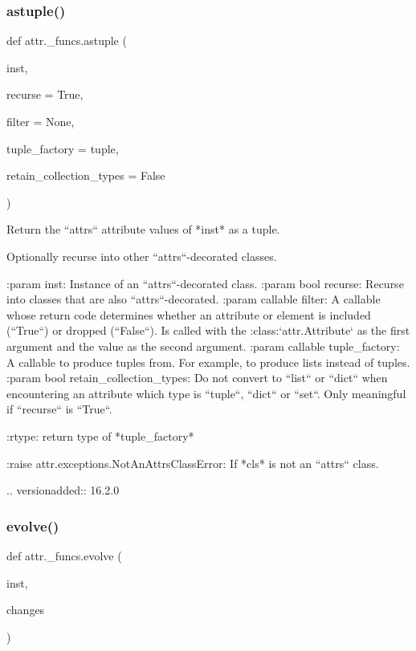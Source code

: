 \subsubsection{\texorpdfstring{astuple()}{astuple()}}
{\footnotesize\ttfamily def attr.\+\_\+funcs.\+astuple (\begin{DoxyParamCaption}\item[{}]{inst,  }\item[{}]{recurse = {\ttfamily True},  }\item[{}]{filter = {\ttfamily None},  }\item[{}]{tuple\+\_\+factory = {\ttfamily tuple},  }\item[{}]{retain\+\_\+collection\+\_\+types = {\ttfamily False} }\end{DoxyParamCaption})}

\begin{DoxyVerb}Return the ``attrs`` attribute values of *inst* as a tuple.

Optionally recurse into other ``attrs``-decorated classes.

:param inst: Instance of an ``attrs``-decorated class.
:param bool recurse: Recurse into classes that are also
    ``attrs``-decorated.
:param callable filter: A callable whose return code determines whether an
    attribute or element is included (``True``) or dropped (``False``).  Is
    called with the :class:`attr.Attribute` as the first argument and the
    value as the second argument.
:param callable tuple_factory: A callable to produce tuples from.  For
    example, to produce lists instead of tuples.
:param bool retain_collection_types: Do not convert to ``list``
    or ``dict`` when encountering an attribute which type is
    ``tuple``, ``dict`` or ``set``.  Only meaningful if ``recurse`` is
    ``True``.

:rtype: return type of *tuple_factory*

:raise attr.exceptions.NotAnAttrsClassError: If *cls* is not an ``attrs``
    class.

..  versionadded:: 16.2.0
\end{DoxyVerb}
 \mbox{\label{namespaceattr_1_1__funcs_ad12e058dede1261831b7d9ce3e0e17f5}} 
\subsubsection{\texorpdfstring{evolve()}{evolve()}}
{\footnotesize\ttfamily def attr.\+\_\+funcs.\+evolve (\begin{DoxyParamCaption}\item[{}]{inst,  }\item[{}]{changes }\end{DoxyParamCaption})}

